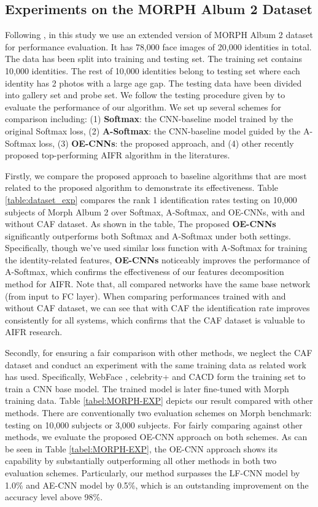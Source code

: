 \documentclass[runningheads]{llncs}
\begin{document}
\subsection{Experiments on the MORPH Album 2 Dataset}
Following \cite{hfa,mefa,lps_hfa,LFCNN}, in this study we use an extended version of MORPH Album 2 dataset \cite{morph} for performance evaluation. It has 78,000 face images of 20,000 identities in total. The data has been split into training and testing set. The training set contains 10,000 identities.
The rest of 10,000 identities belong to testing set where each identity has 2 photos with a large age gap. The testing data have been divided into gallery set and probe set. We follow the testing procedure given by \cite{hfa} to evaluate the performance of our algorithm. We set up several schemes for comparison including: (1) \textbf{Softmax}: the CNN-baseline model trained by the original Softmax loss, (2) \textbf{A-Softmax}: the CNN-baseline model guided by the A-Softmax loss, (3) \textbf{OE-CNNs}: the proposed approach, and (4) other recently proposed top-performing AIFR algorithm in the literatures.

Firstly, we compare the proposed approach to baseline algorithms that are most related to the proposed algorithm to demonstrate its effectiveness. Table \ref{table:dataset_exp} compares the rank 1 identification rates testing on 10,000 subjects of Morph Album 2 over Softmax, A-Softmax, and OE-CNNs, with and without CAF dataset. 
As shown in the table, The proposed \textbf{OE-CNNs} significantly outperforms both Softmax and A-Softmax under both settings. Specifically, though we've used similar loss function with A-Softmax for training the identity-related features, \textbf{OE-CNNs} noticeably improves the performance of A-Softmax, which confirms the effectiveness of our features decomposition method for AIFR. Note that, all compared networks have the same base network (from input to FC layer). When comparing performances trained with and without CAF dataset, we can see that with CAF the identification rate improves consistently for all systems, which confirms that the CAF dataset is valuable to AIFR research.

Secondly, for ensuring a fair comparison with other methods, we neglect the CAF dataset and conduct an experiment with the same training data as related work \cite{LFCNN} has used. Specifically, WebFace \cite{webface}, celebrity+ \cite{celeb} and CACD \cite{cacd} form the training set to train a CNN base model. The trained model is later fine-tuned with Morph training data.
Table \ref{tabel:MORPH-EXP} depicts our result compared with other methods.
There are conventionally two evaluation schemes on Morph benchmark: testing on 10,000 subjects or 3,000 subjects. For fairly comparing against other methods, we evaluate the proposed OE-CNN approach on both schemes.
As can be seen in Table \ref{tabel:MORPH-EXP}, the OE-CNN approach shows its capability by substantially outperforming all other methods in both two evaluation schemes. Particularly, our method surpasses the LF-CNN model by 1.0\% and AE-CNN model by 0.5\%, which is an outstanding improvement on the accuracy level above 98\%. 
\end{document}
